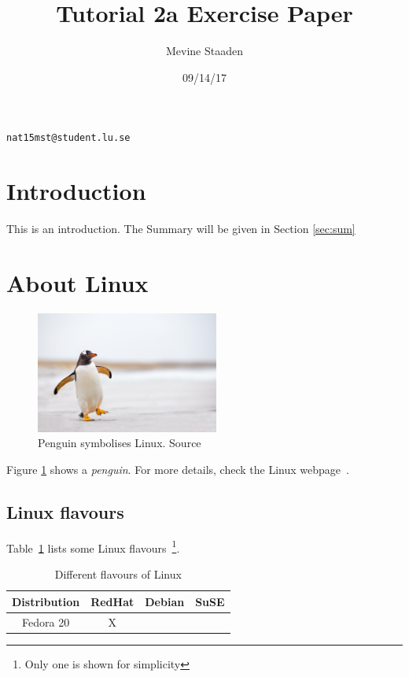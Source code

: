 \documentclass[a4paper,10pt,twoside]{article}
\author{Mevine Staaden}
\title{Tutorial 2a Exercise Paper}
\date{09/14/17}
\begin{document}
  \maketitle

  \begin{center}
    \texttt{nat15mst@student.lu.se}
  \end{center}

\section{Introduction}
\label{sec:intro}

This is an introduction. The Summary will be given in Section \ref{sec:sum}

\section{About Linux}
\label{sec:Linux}

\begin{figure}[h]
  \begin{center}
   \includegraphics[width=6cm]{penguin.jpg}
   \caption{Penguin symbolises Linux. Source~\cite{penguin-image}}
   \label{fig:penguin}
  \end{center}
\end{figure}

Figure \ref{fig:penguin} shows a \textit{penguin}. For more details, check the Linux webpage~\cite{linux}.

\subsection{Linux flavours}
\label{sec:flavours}

Table~\ref{tab:flavours} lists some Linux flavours~\footnote{Only one is shown for simplicity}.

\begin{table}[h]
\begin{center}
 \begin{tabular}{c|c|c|c}
  \textbf{Distribution}&RedHat&Debian&SuSE\\ \hline \hline
  Fedora 20            & X    &      &    \\ \hline
 \end{tabular}
 \caption{Different flavours of Linux}
 \label{tab:flavours}
\end{center}
\end{table}
\end{document}
